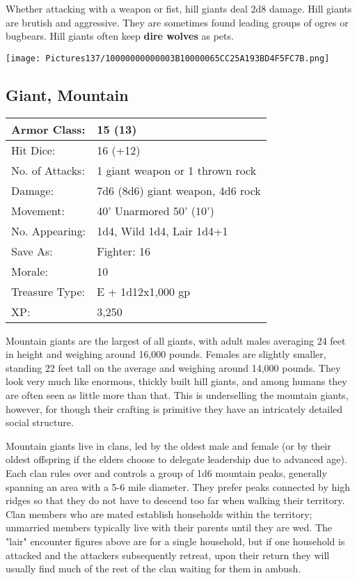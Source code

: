 \documentclass[a4paper,twoside,openany,10pt]{book}
\begin{document}
\begin{multicols}{2}
Whether attacking with a weapon or fist, hill giants deal 2d8 damage. Hill giants are brutish and aggressive. They are sometimes found leading groups of ogres or bugbears. Hill giants often keep \textbf{dire wolves} as pets.

\begin{center}
	\texttt{[image: Pictures137/10000000000003B10000065CC25A193BD4F5FC7B.png]}
\end{center}

\subsection*{Giant, Mountain}\label{giant-mountain}

\begin{tabularx}{0.48\textwidth}{@{}lX@{}}
Armor Class: & 15 (13) \\\hline
Hit Dice: & 16 (+12) \\\hline
No. of Attacks: & 1 giant weapon or 1 thrown rock \\\hline
Damage: & 7d6 (8d6) giant weapon, 4d6 rock \\\hline
Movement: & 40' Unarmored 50'
(10') \\\hline
No. Appearing: & 1d4, Wild 1d4, Lair 1d4+1 \\\hline
Save As: & Fighter: 16 \\\hline
Morale: & 10 \\\hline
Treasure Type: & E + 1d12x1,000 gp \\\hline
XP: & 3,250 \\\hline
\end{tabularx}\medskip

Mountain giants are the largest of all giants, with adult males averaging 24 feet in height and weighing around 16,000 pounds. Females are slightly smaller, standing 22 feet tall on the average and weighing around 14,000 pounds. They look very much like enormous, thickly built hill giants, and among humans they are often seen as little more than that. This is underselling the mountain giants, however, for though their crafting is primitive they have an intricately detailed social structure.

Mountain giants live in clans, led by the oldest male and female (or by their oldest offspring if the elders choose to delegate leadership due to advanced age). Each clan rules over and controls a group of 1d6 mountain peaks, generally spanning an area with a 5-6 mile diameter. They prefer peaks connected by high ridges so that they do not have to descend too far when walking their territory. Clan members who are mated establish households within the territory; unmarried members typically live with their parents until they are wed. The "lair" encounter figures above are for a single household, but if one household is attacked and the attackers subsequently retreat, upon their return they will usually find much of the rest of the clan waiting for them in ambush.


\end{multicols}
\end{document}
